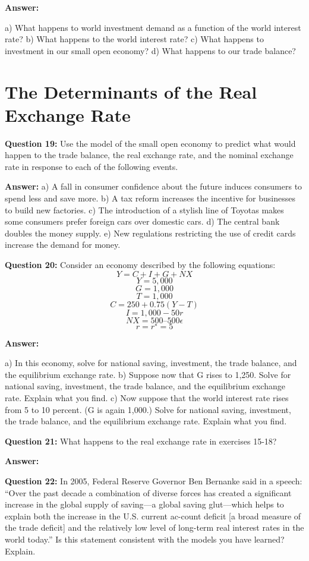 \documentclass[a4paper, 11pt]{article}
\begin{document}
\textbf{Answer:} 

a) What happens to world investment demand as a function of the world interest rate?
b) What happens to the world interest rate?
c) What happens to investment in our small open economy?
d) What happens to our trade balance?

\section{The Determinants of the Real Exchange Rate}

\textbf{Question 19:} Use the model of the small open economy to predict what would happen to the trade balance, the real exchange rate, and the nominal exchange rate in response to each of the following events.

\textbf{Answer:} 
a) A fall in consumer confidence about the future induces consumers to spend less and save more.
b) A tax reform increases the incentive for businesses to build new factories.
c) The introduction of a stylish line of Toyotas makes some consumers prefer foreign cars over domestic cars.
d) The central bank doubles the money supply.
e) New regulations restricting the use of credit cards increase the demand for money.

\textbf{Question 20:} Consider an economy described by the following equations:
$$Y = C + I + G + NX$$
$$Y = 5,000$$
$$G = 1,000$$
$$T = 1,000$$
$$C = 250 + 0.75(Y − T)$$
$$I = 1,000 − 50r$$
$$NX = 500 – 500\epsilon$$
$$r = r^{∗} = 5$$

\textbf{Answer:} 

a) In this economy, solve for national saving, investment, the trade balance, and the equilibrium exchange rate.
b) Suppose now that G rises to 1,250. Solve for national saving, investment, the trade balance, and the equilibrium exchange rate. Explain what you find.
c) Now suppose that the world interest rate rises from 5 to 10 percent. (G is again 1,000.) Solve for national saving, investment, the trade balance, and the equilibrium exchange rate. Explain what you find.

\textbf{Question 21:} What happens to the real exchange rate in exercises 15-18?

\textbf{Answer:} 


\textbf{Question 22:} In 2005, Federal Reserve Governor Ben Bernanke said in a speech: “Over the past decade a combination of diverse forces has created a significant increase in the global supply of saving—a global saving glut—which helps to explain both the increase in the U.S. current ac-count deficit [a broad measure of the trade deficit] and the relatively low level of long-term real interest rates in the world today.” Is this statement consistent with the models you have learned? Explain.
\end{document}
